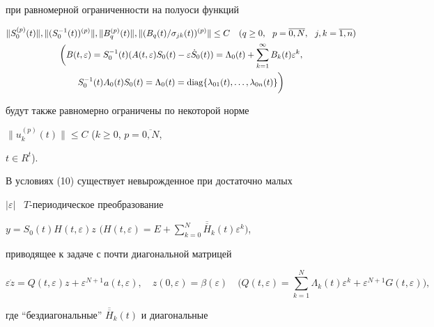 при равномерной ограниченности на полуоси функций


\begin{gather}


\|S_0^{(p)}(t)\|, \|(S_0^{-1}(t))^{(p)} \|,


\|B_q^{(p)}(t) \|, \|(B_q(t)/\sigma_{jk}(t))^{(p)}


\|\leq C \quad(q\geq 0,\ \ p=\overline{0,N},\ \ j,k=\overline{1,n})\\


%


\bigg(B(t,\varepsilon)=S_0^{-1}(t)(A(t,\varepsilon)S_0(t)-\varepsilon


\Dot{S}_0(t))=\Lambda_0(t)+\sum^\infty_{k=1}B_k(t)\varepsilon^k,\notag\\


%


S_0^{-1}(t)A_0(t)S_0(t)=\Lambda_0(t)=


\diag \{\lambda_{01}(t),\dotsc,\lambda_{0n}(t) \}\bigg)\notag


\end{gather}


будут также равномерно ограничены по некоторой норме 


$\|u_k^{(p)}(t) \|\leq C$ ($k\geq 0$, $p=\overline{0,N}$,


$t\in R^t$).





В условиях (10) существует невырожденное при достаточно малых 


$|\varepsilon |$ \ $T$-пе\-ри\-о\-ди\-чес\-кое преобразование


$y=S_0(t)H(t,\varepsilon)z$ $\Big(H(t,\varepsilon)=


E+\sum\limits_{k=0}^N\overline{\overline{H}}_k(t)\varepsilon^k\Big)$,


приводящее к задаче с почти диагональной матрицей


\begin{equation}


\varepsilon\Dot{z}=Q(t,\varepsilon)z+\varepsilon^{N+1} a(t,\varepsilon),


\quad z(0,\varepsilon)=\beta(\varepsilon)\quad \bigg(Q(t,\varepsilon)=


\sum^N_{k=1}\Lambda_k(t)\varepsilon^k+\varepsilon^{N+1}G(t,\varepsilon)\bigg),


\end{equation}


где ``бездиагональные'' $\overline{\overline{H}}_k(t)$ и диагональные 


